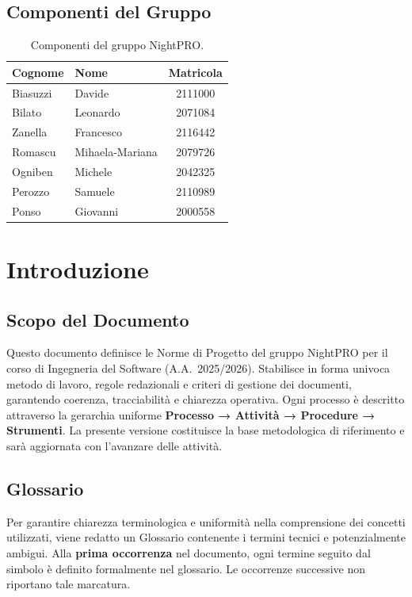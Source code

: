 \documentclass[a4paper, 11pt, oneside]{scrartcl}
\begin{document}
\subsection{Componenti del Gruppo}

\begin{table}[h!]
\centering
\renewcommand{\arraystretch}{1.2}
\begin{tabular}{@{}llc@{}}
\toprule
\textbf{Cognome} & \textbf{Nome} & \textbf{Matricola} \\
\midrule
Biasuzzi   & Davide            & 2111000 \\
Bilato     & Leonardo          & 2071084 \\
Zanella    & Francesco         & 2116442 \\
Romascu    & Mihaela-Mariana   & 2079726 \\
Ogniben    & Michele           & 2042325 \\
Perozzo    & Samuele           & 2110989 \\
Ponso      & Giovanni          & 2000558 \\
\bottomrule
\end{tabular}
\caption{Componenti del gruppo NightPRO.}
\end{table}

\newpage
\section{Introduzione}
\label{sec:introduzione}

\subsection{Scopo del Documento}
Questo documento definisce le Norme di Progetto{\scriptsize{}} del gruppo NightPRO per il corso di Ingegneria del Software (A.A.~2025/2026).
Stabilisce in forma univoca metodo di lavoro, regole redazionali e criteri di gestione dei documenti, garantendo coerenza, tracciabilità e chiarezza operativa.
Ogni processo è descritto attraverso la gerarchia uniforme \textbf{Processo → Attività → Procedure → Strumenti}.
La presente versione costituisce la base metodologica di riferimento e sarà aggiornata con l'avanzare delle attività.

\subsection{Glossario}
Per garantire chiarezza terminologica e uniformità nella comprensione dei concetti utilizzati, viene redatto un Glossario{\scriptsize{}} contenente i termini tecnici e potenzialmente ambigui.
Alla \textbf{prima occorrenza} nel documento, ogni termine seguito dal simbolo {\scriptsize{}} è definito formalmente nel glossario.
Le occorrenze successive non riportano tale marcatura.
\end{document}
